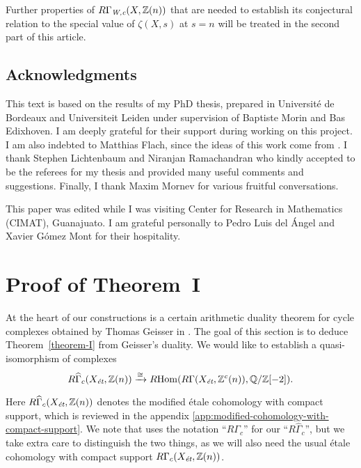 \documentclass{article}
\numberwithin{equation}{section}
\begin{document}
Further properties of $R\Gamma_\Wc (X, \ZZ (n))$ that are needed to establish
its conjectural relation to the special value of $\zeta (X,s)$ at $s = n$ will
be treated in the second part of this article.

\subsection*{Acknowledgments}

This text is based on the results of my PhD thesis, prepared in Université de
Bordeaux and Universiteit Leiden under supervision of Baptiste Morin and Bas
Edixhoven. I am deeply grateful for their support during working on this
project. I am also indebted to Matthias Flach, since the ideas of this work come
from \cite{Flach-Morin-2018}. I thank Stephen Lichtenbaum and Niranjan
Ramachandran who kindly accepted to be the referees for my thesis and provided
many useful comments and suggestions. Finally, I thank Maxim Mornev for various
fruitful conversations.

This paper was edited while I was visiting Center for Research in Mathematics
(CIMAT), Guanajuato. I am grateful personally to Pedro Luis del Ángel and Xavier
Gómez Mont for their hospitality.


\section{Proof of Theorem~I}
\label{sec:arithmetic-duality-theorem}

At the heart of our constructions is a certain arithmetic duality theorem for
cycle complexes obtained by Thomas Geisser in \cite{Geisser-2010}. The goal of
this section is to deduce Theorem~\ref{theorem-I} from Geisser's duality.
We would like to establish a quasi-isomorphism of complexes
\[ R\widehat{\Gamma}_c (X_\et, \ZZ (n)) \xrightarrow{\cong}
\RHom (R\Gamma (X_\et, \ZZ^c (n)), \QQ/\ZZ [-2]). \]

Here $R\widehat{\Gamma}_c (X_\et, \ZZ (n))$ denotes the modified étale
cohomology with compact support, which is reviewed in the appendix
\ref{app:modified-cohomology-with-compact-support}. We note that
\cite{Geisser-2010} uses the notation ``$R\Gamma_c$'' for our
``$R\widehat{\Gamma}_c$'', but we take extra care to distinguish the two things,
as we will also need the usual étale cohomology with compact support
$R\Gamma_c (X_\et, \ZZ (n))$.
\end{document}
